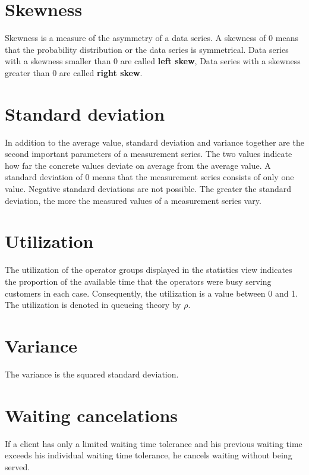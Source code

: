 \section*{Skewness}


Skewness is a measure of the asymmetry of a data series.
A skewness of 0 means that the probability distribution or the data series is symmetrical.
Data series with a skewness smaller than 0 are called \textbf{left skew},
Data series with a skewness greater than 0 are called \textbf{right skew}.

\section*{Standard deviation}


In addition to the average value,
standard deviation and variance together are the second important parameters
of a measurement series. The two values indicate how far the concrete values
deviate on average from the average value. A standard deviation of 0 means
that the measurement series consists of only one value. Negative standard
deviations are not possible. The greater the standard deviation, the more
the measured values of a measurement series vary.

\section*{Utilization}


The utilization of the operator groups displayed in the statistics view indicates the proportion
of the available time that the operators were busy serving customers in each case. Consequently, the utilization is a value between
0 and 1. The utilization is denoted in queueing theory by $\rho$.

\section*{Variance}


The variance is the squared standard deviation.

\section*{Waiting cancelations}


If a client has only a limited waiting time tolerance and his previous waiting time exceeds his
individual waiting time tolerance, he cancels waiting without being served.

